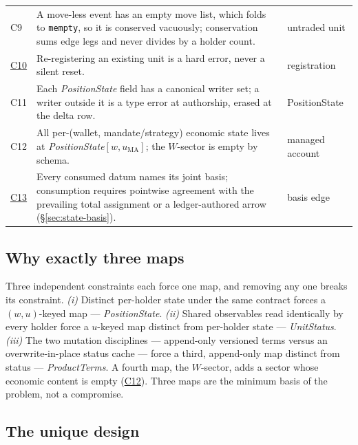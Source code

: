 \documentclass[11pt,a4paper]{article}
\begin{document}
\begin{longtable}{@{}p{0.8cm} p{11.0cm} p{2.5cm}@{}}
\addlinespace
\hypertarget{cond:C9}{C9}\label{cond:C9} & A move-less event has an empty move list, which
folds to \texttt{mempty}, so it is conserved vacuously; conservation sums edge legs and never
divides by a holder count. & untraded unit \\
\addlinespace
\hyperref[cond:C10]{C10} & Re-registering an existing unit is a hard
error, never a silent reset. & registration \\
\addlinespace
\hypertarget{cond:C11}{C11}\label{cond:C11} & Each \emph{PositionState} field has a
canonical writer set; a writer outside it is a type error at authorship, erased at the
delta row. & PositionState \\
\addlinespace
\hypertarget{cond:C12}{C12}\label{cond:C12} & All per-(wallet, mandate/strategy) economic
state lives at \emph{PositionState}$[w,u_{\mathrm{MA}}]$; the $W$-sector is empty by
schema. & managed account \\
\addlinespace
\hyperref[cond:C13]{C13} & Every consumed datum names its joint basis; consumption
requires pointwise agreement with the prevailing total assignment or a ledger-authored
arrow (\S\ref{sec:state-basis}). & basis edge \\
\bottomrule
\end{longtable}

\subsection{Why exactly three maps}
\label{sec:states-pareto-three}

Three independent constraints each force one map, and removing any one breaks its
constraint. \emph{(i)} Distinct per-holder state under the same contract forces a
$(w,u)$-keyed map --- \emph{PositionState}. \emph{(ii)} Shared observables read identically
by every holder force a $u$-keyed map distinct from per-holder state --- \emph{UnitStatus}.
\emph{(iii)} The two mutation disciplines --- append-only versioned terms versus an
overwrite-in-place status cache --- force a third, append-only map distinct from status ---
\emph{ProductTerms}. A fourth map, the $W$-sector, adds a sector whose economic content is
empty (\hyperref[cond:C12]{C12}). Three maps are the minimum basis of the problem, not a
compromise.

\subsection{The unique design}
\label{sec:states-pareto}
\end{document}
